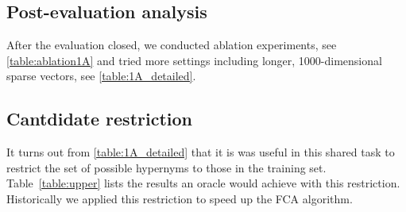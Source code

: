 \documentclass[11pt,a4paper]{article}
\begin{document}




\subsection{Post-evaluation analysis}

After the evaluation closed, we conducted ablation experiments, see
\autoref{table:ablation1A} and 
tried more settings including longer, 1000-dimensional sparse vectors, see
\autoref{table:1A_detailed}.







\subsection{Cantdidate restriction}

It turns out from \autoref{table:1A_detailed} that it is was useful in this
shared task to restrict the set of possible hypernyms to those in the training
set.  Table~\ref{table:upper} lists the results an oracle would achieve with
this restriction. Historically we applied this restriction to speed up the FCA
algorithm.






\end{document}
